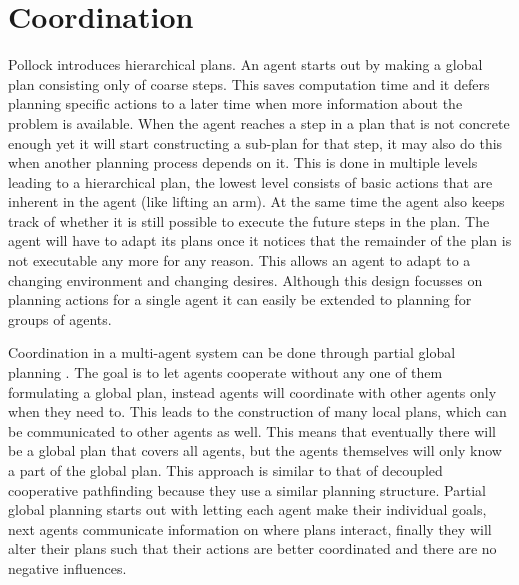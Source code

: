 \documentclass[a4paper]{article}
\begin{document}
\section{Coordination}
Pollock \cite{pollock1995} introduces hierarchical plans. An agent starts out 
by  making a global plan consisting only of coarse steps. This saves 
computation time and it defers planning specific actions to a later time when 
more information about the problem is available. When the agent reaches a step 
in a plan that is not concrete enough yet it will start constructing a sub-plan 
for that step, it may also do this when another planning process depends on it. 
This is done in multiple levels leading to a hierarchical plan, the lowest 
level consists of basic actions that are inherent in the agent (like lifting an 
arm). At the same time the agent also keeps track of whether it is still 
possible to execute the future steps in the plan. The agent will have to adapt 
its plans once it notices that the remainder of the plan is not executable any 
more for any reason. This allows an agent to adapt to a changing environment 
and changing desires. Although this design focusses on planning actions for a 
single agent it can easily be extended to planning for groups of agents.

Coordination in a multi-agent system can be done through partial global 
planning \cite[p. 202--204]{woodridge2009}. The goal is to let agents cooperate 
without any 
one of them formulating a global plan, instead agents will coordinate with 
other agents only when they need to. This leads to the construction of many 
local plans, which can be communicated to other agents as well. This means that 
eventually there will be a global plan that covers all agents, but the agents 
themselves will only know a part of the global plan. This approach is similar 
to that of decoupled cooperative pathfinding because they use a similar 
planning structure. Partial global planning starts out with letting each agent 
make their individual goals, next agents communicate information on where plans 
interact, finally they will alter their plans such that their actions are 
better coordinated and there are no negative influences.



\end{document}
